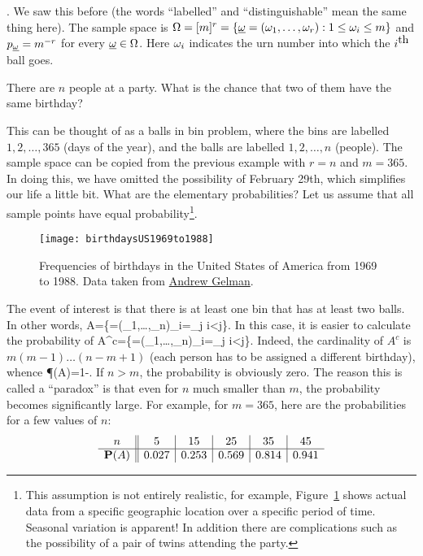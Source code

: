 \documentclass[preprint,  11pt]{amsart}
\def\omeg{\underline{\ome}}
\begin{document}
\begin{example} . We saw this before (the words ``labelled'' and ``distinguishable'' mean the same thing here). The sample space is $\Ome=[m]^{r}=\{\omeg=(\ome_{1},\ldots ,\ome_{r})\suchthat 1\le \ome_{i}\le m\}$ and $p_{\omeg}=m^{-r}$ for every $\omeg\in \Ome$. Here $\ome_{i}$ indicates the urn number into which the $i^{\mb{th}}$ ball goes.
\end{example}

\beg {} There are $n$ people at a party. What is the chance that two of them have the same birthday?

This can be thought of as a balls in bin problem, where the bins are labelled $1,2,\ldots ,365$ (days of the year), and the balls are labelled $1,2,\ldots ,n$ (people). The sample space can be copied from the previous example with $r=n$ and $m=365$. In doing this, we have omitted the possibility of February 29th, which simplifies our life a little bit. What are the elementary probabilities? Let us assume that all sample points have equal probability\footnote{This assumption is not entirely realistic, for example, Figure~\ref{fig:birthdaysUS1969to1988} shows actual data from a specific geographic location over a specific period of time. Seasonal variation is apparent! In addition there are complications such as the possibility of a pair of twins attending the party.}. 
\eeg
\begin{figure}\label{fig:birthdaysUS1969to1988} 
\texttt{[image: birthdaysUS1969to1988]}
\caption{Frequencies of birthdays in the United States of America from 1969 to 1988. Data taken from \href{http://andrewgelman.com/2012/06/12/simple-graph-win-the-example-of-birthday-frequencies/}{Andrew Gelman}.}
\end{figure}
The event of interest is that there is at least one bin that has at least two balls. In other words,
\ba
A=\{\omeg=(\ome_1,\ldots ,\ome_n)\suchthat \ome_i=\ome_j i<j\}. 
\ea 
In this case, it is easier to calculate the probability of 
\ba
A^c=\{\omeg=(\ome_1,\ldots ,\ome_n)\suchthat \ome_i\not=\ome_j i<j\}. 
\ea 
Indeed, the cardinality of $A^c$ is $m(m-1)\ldots (n-m+1)$ (each person has to be assigned a different birthday), whence
\ba 
\P(A)=1-.
\ea
If $n>m$, the probability is obviously zero. The reason this is called a ``paradox'' is that even for $n$ much smaller than $m$, the probability becomes significantly large. For example, for $m=365$, here are the probabilities for a few values of $n$:
\begin{align*}
\begin{array}{c||c|c|c|c|c}
n & 5 & 15 & 25 & 35 & 45 \\ \hline 
\P(A) & 0.027 & 0.253 &  0.569 &  0.814 & 0.941 
\end{array}
\end{align*}
\end{document}
